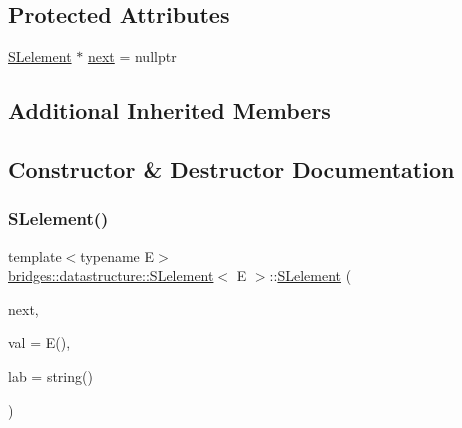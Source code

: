 \subsection*{Protected Attributes}
\begin{DoxyCompactItemize}
\item 
\mbox{\hyperlink{classbridges_1_1datastructure_1_1_s_lelement}{S\+Lelement}} $\ast$ \mbox{\hyperlink{classbridges_1_1datastructure_1_1_s_lelement_afc016a593a4a5aba82021ee34edadbfc}{next}} = nullptr
\end{DoxyCompactItemize}
\subsection*{Additional Inherited Members}


\subsection{Constructor \& Destructor Documentation}
\mbox{\label{classbridges_1_1datastructure_1_1_s_lelement_ac69e99f5b2b729a217160ee0517751aa}} 
\subsubsection{\texorpdfstring{S\+Lelement()}{SLelement()}\hspace{0.1cm}{\footnotesize\ttfamily [1/2]}}
{\footnotesize\ttfamily template$<$typename E$>$ \\
\mbox{\hyperlink{classbridges_1_1datastructure_1_1_s_lelement}{bridges\+::datastructure\+::\+S\+Lelement}}$<$ E $>$\+::\mbox{\hyperlink{classbridges_1_1datastructure_1_1_s_lelement}{S\+Lelement}} (\begin{DoxyParamCaption}\item[{\mbox{\hyperlink{classbridges_1_1datastructure_1_1_s_lelement}{S\+Lelement}}$<$ E $>$ $\ast$}]{next,  }\item[{const E \&}]{val = {\ttfamily E()},  }\item[{const string \&}]{lab = {\ttfamily string()} }\end{DoxyParamCaption})\hspace{0.3cm}{\ttfamily [inline]}}

